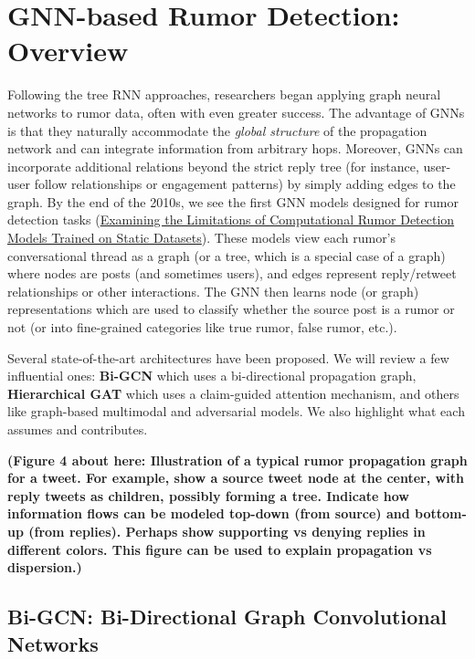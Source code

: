 \documentclass[12pt,a4paper]{report}
\begin{document}
\section{GNN-based Rumor Detection: Overview}

Following the tree RNN approaches, researchers began applying graph neural networks to rumor data, often with even greater success. The advantage of GNNs is that they naturally accommodate the \textit{global structure} of the propagation network and can integrate information from arbitrary hops. Moreover, GNNs can incorporate additional relations beyond the strict reply tree (for instance, user-user follow relationships or engagement patterns) by simply adding edges to the graph. By the end of the 2010s, we see the first GNN models designed for rumor detection tasks (\href{https://arxiv.org/html/2309.11576v2#:~:text=to%20be%20modeled%20with%20contextual,54}{Examining the Limitations of Computational Rumor Detection Models Trained on Static Datasets}). These models view each rumor’s conversational thread as a graph (or a tree, which is a special case of a graph) where nodes are posts (and sometimes users), and edges represent reply/retweet relationships or other interactions. The GNN then learns node (or graph) representations which are used to classify whether the source post is a rumor or not (or into fine-grained categories like true rumor, false rumor, etc.).

Several state-of-the-art architectures have been proposed. We will review a few influential ones: \textbf{Bi-GCN} which uses a bi-directional propagation graph, \textbf{Hierarchical GAT} which uses a claim-guided attention mechanism, and others like graph-based multimodal and adversarial models. We also highlight what each assumes and contributes.

\textbf{(Figure 4 about here: Illustration of a typical rumor propagation graph for a tweet. For example, show a source tweet node at the center, with reply tweets as children, possibly forming a tree. Indicate how information flows can be modeled top-down (from source) and bottom-up (from replies). Perhaps show supporting vs denying replies in different colors. This figure can be used to explain propagation vs dispersion.)}

\subsection{Bi-GCN: Bi-Directional Graph Convolutional Networks}
\end{document}

